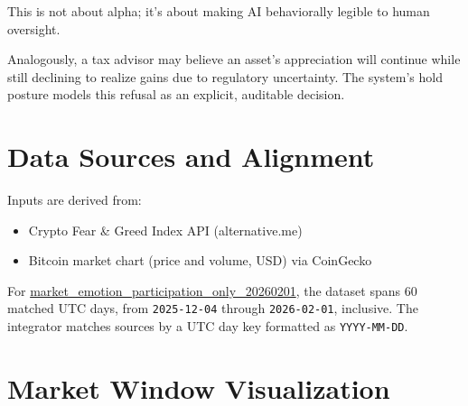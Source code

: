\documentclass[12pt,a4paper]{article}
\begin{document}
This is not about alpha; it's about making AI behaviorally legible to human oversight.

Analogously, a tax advisor may believe an asset's appreciation will continue while still declining to realize gains due to regulatory uncertainty. The system's hold posture models this refusal as an explicit, auditable decision.

\section{Data Sources and Alignment}

Inputs are derived from:

\begin{itemize}
	\item Crypto Fear \& Greed Index API (alternative.me) \citep{AlternativeMeFNG}
	\item Bitcoin market chart (price and volume, USD) via CoinGecko \citep{CoinGeckoMarketChart}
\end{itemize}

For \href{https://github.com/jhcragin/SpiralBrain-v3.0-public/tree/main/Emotion-Conditioned%20Risk%20Posture%20in%20Crypto%20Markets/results}{market_emotion_participation_only_20260201}, the dataset spans 60 matched UTC days, from \texttt{2025-12-04} through \texttt{2026-02-01}, inclusive. The integrator matches sources by a UTC day key formatted as \texttt{YYYY-MM-DD}.

\section{Market Window Visualization}
\end{document}
